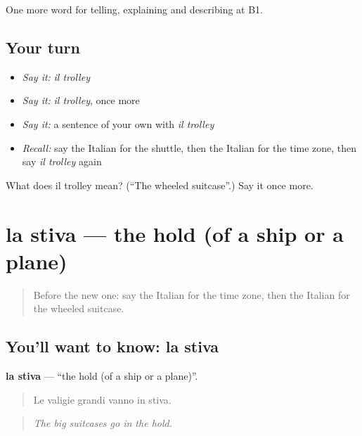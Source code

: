 \begin{grammarlens}[title={What you've built}]
One more word for telling, explaining and describing at B1.
\end{grammarlens}

\subsection*{Your turn}
\begin{itemize}
\raggedright
  \item \emph{Say it:} \emph{il trolley}
  \item \emph{Say it:} \emph{il trolley}, once more
  \item \emph{Say it:} a sentence of your own with \emph{il trolley}
  \item \emph{Recall:} say the Italian for the shuttle, then the Italian for the time zone, then say \emph{il trolley} again
\end{itemize}

\begin{tcolorbox}[breakable,colback=teal!4,colframe=teal!35!black,title={Before you move on}]
What does il trolley mean? (\textquotedblleft{}The wheeled suitcase\textquotedblright{}.) Say it once more.
\end{tcolorbox}
\section[la stiva]{la stiva — the hold (of a ship or a plane)}

\label{lesson:IT-C426-stiva}



\begin{quote}
Before the new one: say the Italian for the time zone, then the Italian for the wheeled suitcase.
\end{quote}

\subsection*{You'll want to know: la stiva}
\textbf{la stiva} — \textquotedblleft{}the hold (of a ship or a plane)\textquotedblright{}.

\begin{quote}
Le valigie grandi vanno in stiva.
\end{quote}

\begin{quote}
\emph{The big suitcases go in the hold.}
\end{quote}

